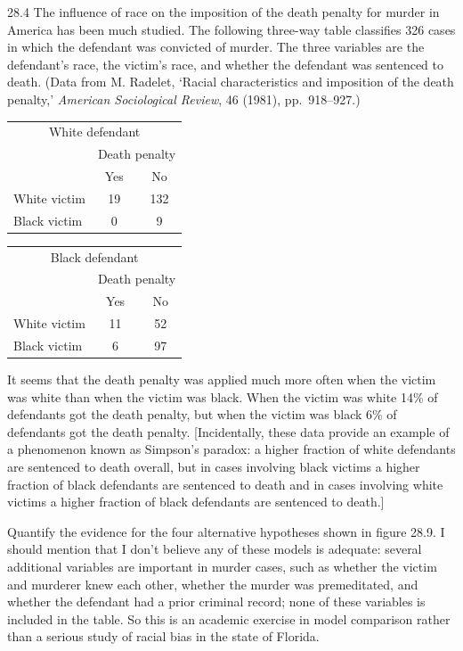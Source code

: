 \documentclass[12pt, a4paper]{article}
\begin{document}
\begin{prob}{28.4}
The influence of race on the imposition of the death penalty for murder in America has been much studied. The following three-way table classifies 326 cases in which the defendant was convicted of murder. The three variables are the defendant's race, the victim's race, and whether the defendant was sentenced to death. (Data from M. Radelet, `Racial characteristics and imposition of the death penalty,' \emph{American Sociological Review}, 46 (1981), pp.\ 918--927.)
\begin{center}
\begin{tabular}{lcc}
\multicolumn{3}{c}{White defendant} \\
 & \multicolumn{2}{c}{Death penalty} \\
 & Yes & No \\
\hline
White victim & 19 & 132 \\
Black victim & 0 & 9
\end{tabular}
\qquad
\begin{tabular}{lcc}
\multicolumn{3}{c}{Black defendant} \\
 & \multicolumn{2}{c}{Death penalty} \\
 & Yes & No \\
\hline
White victim & 11 & 52 \\
Black victim & 6 & 97
\end{tabular}
\end{center}
It seems that the death penalty was applied much more often when the victim was white than when the victim was black. When the victim was white 14\% of defendants got the death penalty, but when the victim was black 6\% of defendants got the death penalty. [Incidentally, these data provide an example of a phenomenon known as Simpson's paradox: a higher fraction of white defendants are sentenced to death overall, but in cases involving black victims a higher fraction of black defendants are sentenced to death and in cases involving white victims a higher fraction of black defendants are sentenced to death.]

Quantify the evidence for the four alternative hypotheses shown in figure 28.9. I should mention that I don't believe any of these models is adequate: several additional variables are important in murder cases, such as whether the victim and murderer knew each other, whether the murder was premeditated, and whether the defendant had a prior criminal record; none of these variables is included in the table. So this is an academic exercise in model comparison rather than a serious study of racial bias in the state of Florida.


\end{prob}
\end{document}
